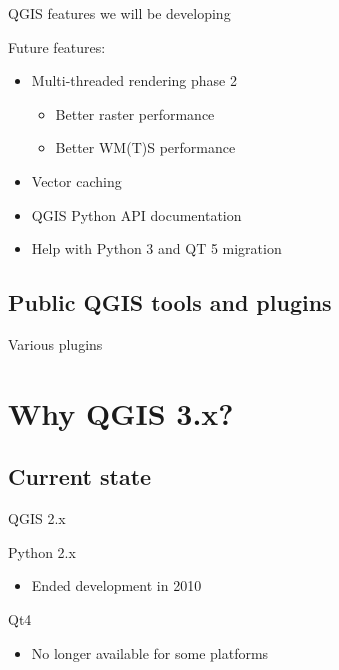 \begin{frame}{QGIS features we will be developing}
	\begin{block}{Future features:}
		\begin{itemize}
			\item Multi-threaded rendering phase 2 
			\begin{itemize}
				\item Better raster performance
				\item Better WM(T)S performance
			\end{itemize}
			\item Vector caching 
			\item QGIS Python API documentation
			\item Help with Python 3 and QT 5 migration
		
		\end{itemize}
	\end{block}
\end{frame}

\subsection{Public QGIS tools and plugins}
\begin{frame}{Various plugins}
\end{frame}

\section{Why QGIS 3.x? }
\subsection{Current state}
\begin{frame}{QGIS 2.x}
	\begin{block}{Python 2.x}
		\begin{itemize}
			\item Ended development in 2010
		\end{itemize}
	\end{block}
\begin{block}{Qt4}
	\begin{itemize}
		\item No longer available for some platforms
	\end{itemize}
\end{block}
\end{frame}

